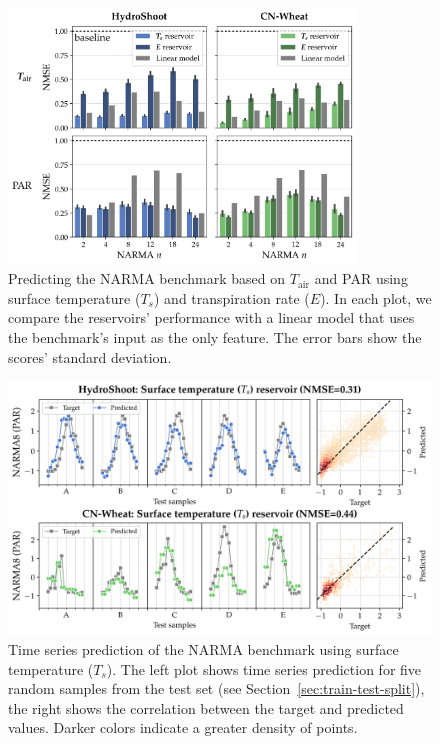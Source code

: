\begin{figure}[hp]
	\centering
    \includegraphics[width=0.82\textwidth]{img/comp_NARMA_perf.png}
	\caption[Predicting the NARMA benchmark based on $T_{\text{air}}$ and PAR using surface temperature ($T_s$) and transpiration rate ($E$).]%
	{Predicting the NARMA benchmark based on $T_{\text{air}}$ and PAR using surface temperature ($T_s$) and transpiration rate ($E$).
	In each plot, we compare the reservoirs' performance with a linear model that uses the benchmark's input as the only feature.
	The error bars show the scores' standard deviation.}
	\label{fig:narma-scores}
\end{figure}

\begin{figure}[hp]
	\centering
    \includegraphics[width=\linewidth,keepaspectratio]{img/regression_res_prediction__input_PARi_NARMA_8__state__Ts.png}
    \caption[Time series prediction of the NARMA benchmark using surface temperature ($T_s$).]
        {Time series prediction of the NARMA benchmark using surface temperature ($T_s$).
        The left plot shows time series prediction for five random samples from the test set (see \mbox{Section \ref{sec:train-test-split}}),
         the right shows the correlation between the target and predicted values. Darker colors indicate a greater density of points.}
	\label{fig:predictions-narma}
\end{figure}

